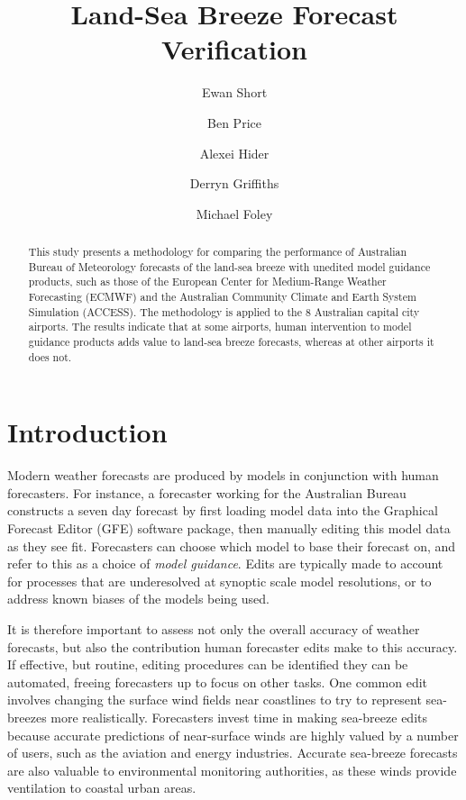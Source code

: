 \documentclass[alpha-refs]{wiley-article}
\title{Land-Sea Breeze Forecast Verification}
\author[1]{Ewan Short}
\author[2]{Ben Price}
\author[3]{Alexei Hider}
\author[3]{Derryn Griffiths}
\author[3]{Michael Foley}
\affil[1]{ARC Centre of Excellence for Climate Extremes, School of Earth Sciences, University of Melbourne, Parkville, VIC, 3010, Australia}
\affil[2]{Bureau of Meteorology, Casuarina, NT, 0810, Australia}
\affil[3]{Bureau of Meteorology, Melbourne, VIC, 3208, Australia}
\begin{document}
\maketitle

\begin{abstract}
This study presents a methodology for comparing the performance of Australian Bureau of Meteorology forecasts of the land-sea breeze with unedited model guidance products, such as those of the European Center for Medium-Range Weather Forecasting (ECMWF) and the Australian Community Climate and Earth System Simulation (ACCESS). The methodology is applied to the 8 Australian capital city airports. The results indicate that at some airports, human intervention to model guidance products adds value to land-sea breeze forecasts, whereas at other airports it does not. 

\end{abstract}

\section{Introduction}\label{introduction}
Modern weather forecasts are produced by models in conjunction with human forecasters. For instance, a forecaster working for the Australian Bureau constructs a seven day forecast by first loading model data into the Graphical Forecast Editor (GFE) software package, then manually editing this model data as they see fit. Forecasters can choose which model to base their forecast on, and refer to this as a choice of \textit{model guidance}. Edits are typically made to account for processes that are underesolved at synoptic scale model resolutions, or to address known biases of the models being used. 

It is therefore important to assess not only the overall accuracy of weather forecasts, but also the contribution human forecaster edits make to this accuracy. If effective, but routine, editing procedures can be identified they can be automated, freeing forecasters up to focus on other tasks. One common edit involves changing the surface wind fields near coastlines to try to represent sea-breezes more realistically. Forecasters invest time in making sea-breeze edits because accurate predictions of near-surface winds are highly valued by a number of users, such as the aviation and energy \citep{smith09} industries. Accurate sea-breeze forecasts are also valuable to environmental monitoring authorities, as these winds provide ventilation to coastal urban areas.
\end{document}
